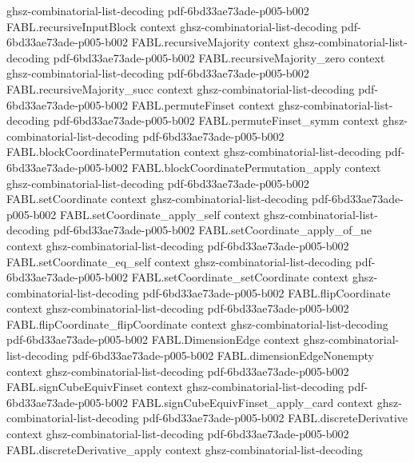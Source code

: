 \begin{theorem}
  {ghsz-combinatorial-list-decoding}
  {pdf-6bd33ae73ade-p005-b002}
\proofstep
  {FABL.recursiveInputBlock}
  {context}
  {ghsz-combinatorial-list-decoding}
  {pdf-6bd33ae73ade-p005-b002}
\proofstep
  {FABL.recursiveMajority}
  {context}
  {ghsz-combinatorial-list-decoding}
  {pdf-6bd33ae73ade-p005-b002}
\proofstep
  {FABL.recursiveMajority_zero}
  {context}
  {ghsz-combinatorial-list-decoding}
  {pdf-6bd33ae73ade-p005-b002}
\proofstep
  {FABL.recursiveMajority_succ}
  {context}
  {ghsz-combinatorial-list-decoding}
  {pdf-6bd33ae73ade-p005-b002}
\proofstep
  {FABL.permuteFinset}
  {context}
  {ghsz-combinatorial-list-decoding}
  {pdf-6bd33ae73ade-p005-b002}
\proofstep
  {FABL.permuteFinset_symm}
  {context}
  {ghsz-combinatorial-list-decoding}
  {pdf-6bd33ae73ade-p005-b002}
\proofstep
  {FABL.blockCoordinatePermutation}
  {context}
  {ghsz-combinatorial-list-decoding}
  {pdf-6bd33ae73ade-p005-b002}
\proofstep
  {FABL.blockCoordinatePermutation_apply}
  {context}
  {ghsz-combinatorial-list-decoding}
  {pdf-6bd33ae73ade-p005-b002}
\proofstep
  {FABL.setCoordinate}
  {context}
  {ghsz-combinatorial-list-decoding}
  {pdf-6bd33ae73ade-p005-b002}
\proofstep
  {FABL.setCoordinate_apply_self}
  {context}
  {ghsz-combinatorial-list-decoding}
  {pdf-6bd33ae73ade-p005-b002}
\proofstep
  {FABL.setCoordinate_apply_of_ne}
  {context}
  {ghsz-combinatorial-list-decoding}
  {pdf-6bd33ae73ade-p005-b002}
\proofstep
  {FABL.setCoordinate_eq_self}
  {context}
  {ghsz-combinatorial-list-decoding}
  {pdf-6bd33ae73ade-p005-b002}
\proofstep
  {FABL.setCoordinate_setCoordinate}
  {context}
  {ghsz-combinatorial-list-decoding}
  {pdf-6bd33ae73ade-p005-b002}
\proofstep
  {FABL.flipCoordinate}
  {context}
  {ghsz-combinatorial-list-decoding}
  {pdf-6bd33ae73ade-p005-b002}
\proofstep
  {FABL.flipCoordinate_flipCoordinate}
  {context}
  {ghsz-combinatorial-list-decoding}
  {pdf-6bd33ae73ade-p005-b002}
\proofstep
  {FABL.DimensionEdge}
  {context}
  {ghsz-combinatorial-list-decoding}
  {pdf-6bd33ae73ade-p005-b002}
\proofstep
  {FABL.dimensionEdgeNonempty}
  {context}
  {ghsz-combinatorial-list-decoding}
  {pdf-6bd33ae73ade-p005-b002}
\proofstep
  {FABL.signCubeEquivFinset}
  {context}
  {ghsz-combinatorial-list-decoding}
  {pdf-6bd33ae73ade-p005-b002}
\proofstep
  {FABL.signCubeEquivFinset_apply_card}
  {context}
  {ghsz-combinatorial-list-decoding}
  {pdf-6bd33ae73ade-p005-b002}
\proofstep
  {FABL.discreteDerivative}
  {context}
  {ghsz-combinatorial-list-decoding}
  {pdf-6bd33ae73ade-p005-b002}
\proofstep
  {FABL.discreteDerivative_apply}
  {context}
  {ghsz-combinatorial-list-decoding}

\end{theorem}
